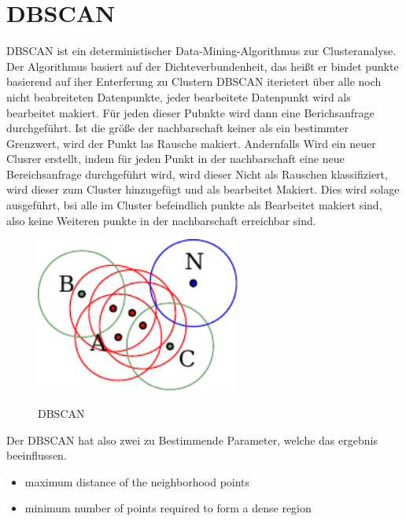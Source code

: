 \section{\acl{DBSCAN}}
\ac{DBSCAN} \cite{DBSCAN} ist ein deterministischer Data-Mining-Algorithmus zur Clusteranalyse. Der Algorithmus basiert auf der Dichteverbundenheit, das heißt er bindet punkte basierend auf iher Enterferung zu Clustern
\ac{DBSCAN} iterietert über alle  noch nicht beabreiteten Datenpunkte, jeder bearbeitete Datenpunkt wird als bearbeitet makiert. Für jeden dieser Pubnkte wird dann eine Berichsanfrage durchgeführt.
Ist die größe der nachbarschaft keiner als ein bestimmter Grenzwert, wird der Punkt las Rausche makiert. Andernfalls Wird ein neuer Clusrer erstellt, indem für jeden Punkt in
der nachbarschaft eine neue Bereichsanfrage durchgeführt wird, wird dieser Nicht als Rauschen klassifiziert, wird dieser zum Cluster hinzugefügt und als bearbeitet Makiert.
Dies wird solage ausgeführt, bsi alle im Cluster befeindlich punkte als Bearbeitet makiert sind, also keine Weiteren punkte in der nachbarschaft erreichbar sind.

\begin{figure}[!ht]
\begin{center}
\caption{\acs{DBSCAN} \cite{DBSCAN}}
\includegraphics[width=0.6\textwidth]{bilder/dbscan.pdf}
\label{dbscan}
\end{center}
\end{figure}



Der \ac{DBSCAN} hat also zwei zu Bestimmende Parameter, welche das ergebnis beeinflussen.
\begin{itemize}
 \item maximum distance of the neighborhood points
 \item minimum number of points required to form a dense region
\end{itemize}






